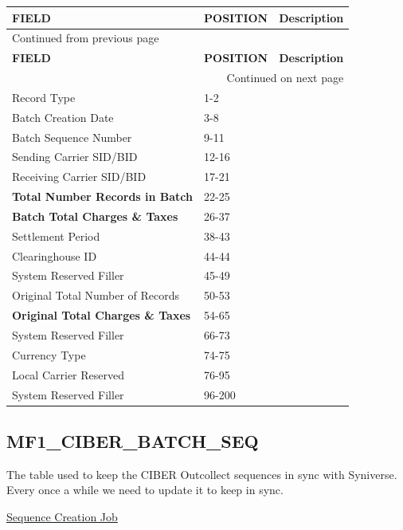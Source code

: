 \documentclass[12pt,twoside]{article}
\begin{document}
\begin{longtable}{l|l|l}
\hline
\textbf{FIELD} & \textbf{POSITION} & \textbf{Description}\\
\hline
\endfirsthead
\multicolumn{3}{l}{Continued from previous page} \\
\hline

\textbf{FIELD} & \textbf{POSITION} & \textbf{Description} \\

\hline
\endhead
\hline\multicolumn{3}{r}{Continued on next page} \\
\endfoot
\endlastfoot
\hline
Record Type & 1-2 & \\
Batch Creation Date & 3-8 & \\
Batch Sequence Number & 9-11 & \\
Sending Carrier SID/BID & 12-16 & \\
Receiving Carrier SID/BID & 17-21 & \\
\textbf{Total Number Records in Batch} & 22-25 & \\
\textbf{Batch Total Charges \& Taxes} & 26-37 & \\
Settlement Period & 38-43 & \\
Clearinghouse ID & 44-44 & \\
System Reserved Filler & 45-49 & \\
Original Total Number of Records & 50-53 & \\
\textbf{Original Total Charges \& Taxes} & 54-65 & \\
System Reserved Filler & 66-73 & \\
Currency Type & 74-75 & \\
Local Carrier Reserved & 76-95 & \\
System Reserved Filler & 96-200 & \\
\hline
\end{longtable}
\normalsize
\subsection{MF1\_CIBER\_BATCH\_SEQ}
\label{sec:orgheadline25}
The table used to keep the CIBER Outcollect sequences in sync
with Syniverse. Every once a while we need to update it to keep
in sync.

\href{file:///home/dbalchen/workspace/Outcollects/updateSeq.pl}{Sequence Creation Job}
\end{document}
